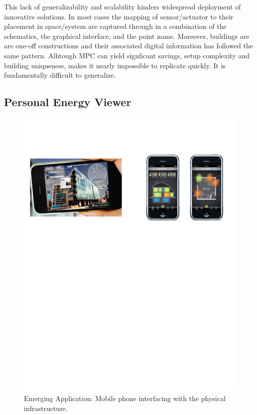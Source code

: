 This lack of generalizability and scalability hinders widespread deployment of innovative solutions.  In most cases the 
mapping of sensor/actuator to their placement in space/system are 
captured through in a combination of the schematics, the graphical interface, and the point name. Moreover, buildings are 
are one-off constructions and their associated digital information has followed the same pattern.  Alhtough MPC can yield signficant savings, setup complexity and building uniqueness, makes it nearly impossible to replicate quickly.  It is fundamentally difficult to generalize. 


\subsection{Personal Energy Viewer}
\label{sec:mobile}

\begin{figure}[h!] %
\centering
\includegraphics[width=0.75\columnwidth]{figs/mobileEnergy1}
\caption{Emerging Application: Mobile phone interfacing with the physical infrastructure.}
\label{fig:mobileEnergy1}
\end{figure}

